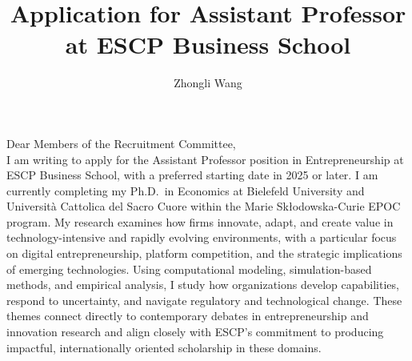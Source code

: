 \documentclass{nfr}
\title{Application for Assistant Professor at ESCP Business School}
\author{Zhongli Wang}
\begin{document}

% 
% 
% 
% 


\maketitle


\noindent Dear Members of the Recruitment Committee,\\[0.2cm]

I am writing to apply for the Assistant Professor position in Entrepreneurship at ESCP Business School, with a preferred starting date in 2025 or later. 
I am currently completing my Ph.D.\ in Economics at Bielefeld University and Università Cattolica del Sacro Cuore within the Marie Skłodowska-Curie EPOC program. 
My research examines how firms innovate, adapt, and create value in technology-intensive and rapidly evolving environments, with a particular focus on digital entrepreneurship, platform competition, and the strategic implications of emerging technologies. 
Using computational modeling, simulation-based methods, and empirical analysis, I study how organizations develop capabilities, respond to uncertainty, and navigate regulatory and technological change. 
These themes connect directly to contemporary debates in entrepreneurship and innovation research and align closely with ESCP’s commitment to producing impactful, internationally oriented scholarship in these domains.\\
\end{document}
